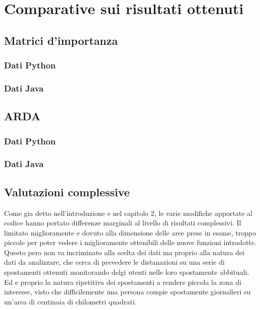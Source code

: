 \chapter{Comparative sui risultati ottenuti}

\section{Matrici d'importanza}
\subsection{Dati Python}
\subsection{Dati Java}

\section{ARDA}
\subsection{Dati Python}
\subsection{Dati Java}

\section{Valutazioni complessive}
Come gia detto nell'introduzione e nel capitolo 2, le varie modifiche apportate
al codice hanno portato differenze marginali al livello di risultati complessivi.
Il limitato miglioramente e dovuto alla dimensione delle aree prese in esame, troppo
piccole per poter vedere i miglioramente ottenibili delle nuove funzioni introdotte.\\
Questo pero non va incriminato alla scelta dei dati ma proprio alla natura dei
dati da analizzare, che cerca di prevedere le distanazioni su una serie di spostamenti
ottenuti monitorando delgi utenti nelle loro spostamente abbituali. Ed e proprio la
natura ripetitiva dei spostamenti a rendere piccola la zona di interesse, visto che
difficilemente una persona compie spostamente giornalieri su un'area di centinaia di
chilometri quadrati.
